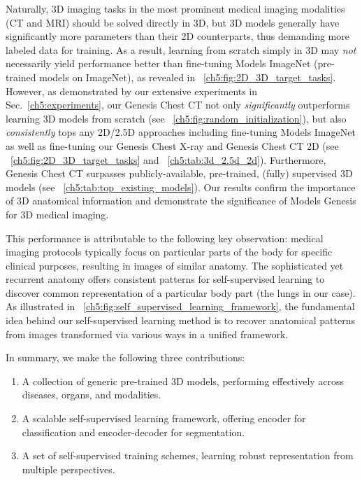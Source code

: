 Naturally, 3D imaging tasks in the most prominent medical imaging modalities (\eg CT and MRI) should be solved directly in 3D, but 3D models generally have significantly more parameters than their 2D counterparts, thus demanding more labeled data for training. As a result, learning from scratch simply in 3D may {\em not} necessarily yield performance better than fine-tuning Models ImageNet (\ie pre-trained models on ImageNet), as revealed in \figurename~\ref{ch5:fig:2D_3D_target_tasks}. However, as demonstrated by our extensive experiments in Sec.~\ref{ch5:experiments}, our Genesis Chest CT not only {\em significantly} outperforms learning 3D models from scratch (see \figurename~\ref{ch5:fig:random_initialization}), but also {\em consistently} tops any 2D/2.5D approaches including fine-tuning Models ImageNet as well as fine-tuning our Genesis Chest X-ray and Genesis Chest CT 2D (see \figurename~\ref{ch5:fig:2D_3D_target_tasks} and \tablename~\ref{ch5:tab:3d_2.5d_2d}). Furthermore, Genesis Chest CT surpasses publicly-available, pre-trained, (fully) supervised 3D models (see \tablename~\ref{ch5:tab:top_existing_models}). Our results  confirm the importance of 3D anatomical information and demonstrate the significance of Models Genesis for 3D medical imaging.

This performance is attributable to the following key observation: medical imaging protocols typically focus on particular parts of the body for specific clinical purposes, resulting in images of similar anatomy. The sophisticated yet recurrent anatomy offers consistent patterns for self-supervised learning to discover common representation of a particular body part (the lungs in our case). 
As illustrated in \figurename~\ref{ch5:fig:self_supervised_learning_framework}, the fundamental idea behind our self-supervised learning method is to recover anatomical patterns from images transformed via various ways in a unified framework. 

In summary, we make the following three contributions:
\begin{enumerate}
    \item A collection of generic pre-trained 3D models, performing effectively across diseases, organs, and modalities.
    \item A scalable self-supervised learning framework, offering encoder for classification and encoder-decoder for segmentation.
    \item A set of self-supervised training schemes, learning robust representation from multiple perspectives.
\end{enumerate}


